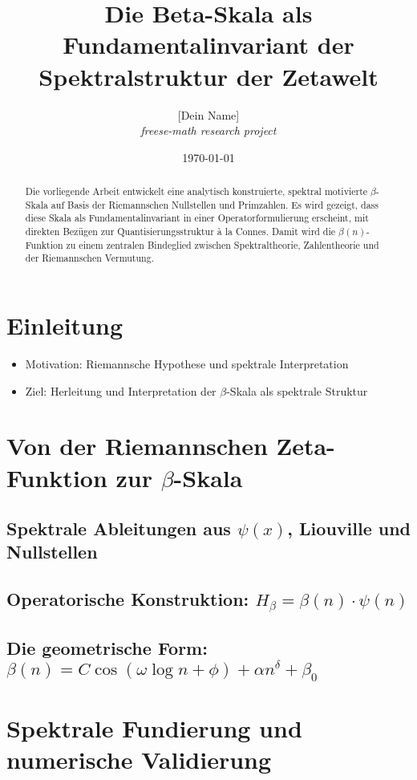 \documentclass[12pt]{article}
\title{Die Beta-Skala als Fundamentalinvariant der Spektralstruktur der Zetawelt}
\author{[Dein Name] \\ \small{\textit{freese-math research project}}}
\date{\today}
\begin{document}
\maketitle

\begin{abstract}
Die vorliegende Arbeit entwickelt eine analytisch konstruierte, spektral motivierte \(\beta\)-Skala auf Basis der Riemannschen Nullstellen und Primzahlen. Es wird gezeigt, dass diese Skala als Fundamentalinvariant in einer Operatorformulierung erscheint, mit direkten Bezügen zur Quantisierungsstruktur à la Connes. Damit wird die \(\beta(n)\)-Funktion zu einem zentralen Bindeglied zwischen Spektraltheorie, Zahlentheorie und der Riemannschen Vermutung.
\end{abstract}

\tableofcontents

\section{Einleitung}
\begin{itemize}
    \item Motivation: Riemannsche Hypothese und spektrale Interpretation
    \item Ziel: Herleitung und Interpretation der \(\beta\)-Skala als spektrale Struktur
\end{itemize}

\section{Von der Riemannschen Zeta-Funktion zur \(\beta\)-Skala}
\subsection{Spektrale Ableitungen aus \(\psi(x)\), Liouville und Nullstellen}
\subsection{Operatorische Konstruktion: \(H_\beta = \beta(n) \cdot \psi(n)\)}
\subsection{Die geometrische Form: \(\beta(n) = C \cos(\omega \log n + \phi) + \alpha n^\delta + \beta_0\)}

\section{Spektrale Fundierung und numerische Validierung}
\end{document}

